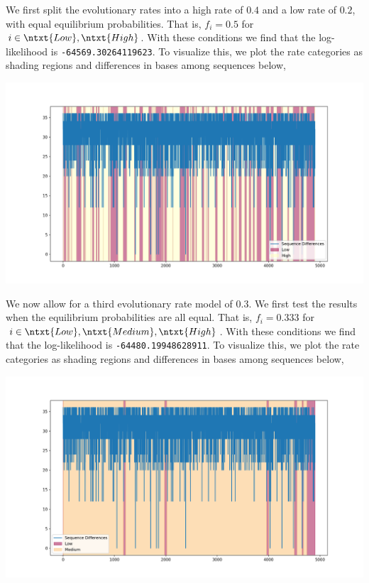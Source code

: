 \documentclass[12pt]{article}
\begin{document}
    We first split the evolutionary rates into a high rate of $0.4$ and a low rate of $0.2$,
    with equal equilibrium probabilities.
    That is, $f_i = 0.5$ for $i \in {\ntxt{Low},\ntxt{High}}$.
    With these conditions we find that the log-likelihood is \texttt{-64569.30264119623}.
    To visualize this, we plot the rate categories as shading regions and differences in bases among sequences below,
    \begin{center}
        \includegraphics[scale=0.5]{../figs/high_low.png}
    \end{center}

    We now allow for a third evolutionary rate model of $0.3$.
    We first test the results when the equilibrium probabilities are all equal.
    That is, $f_i = 0.333$ for $i \in {\ntxt{Low},\ntxt{Medium}, \ntxt{High}}$.
    With these conditions we find that the log-likelihood is \texttt{-64480.19948628911}.
    To visualize this, we plot the rate categories as shading regions and differences in bases among sequences below,
    \begin{center}
        \includegraphics[scale=0.5]{../figs/high_med_low.png}
    \end{center}
\end{document}
